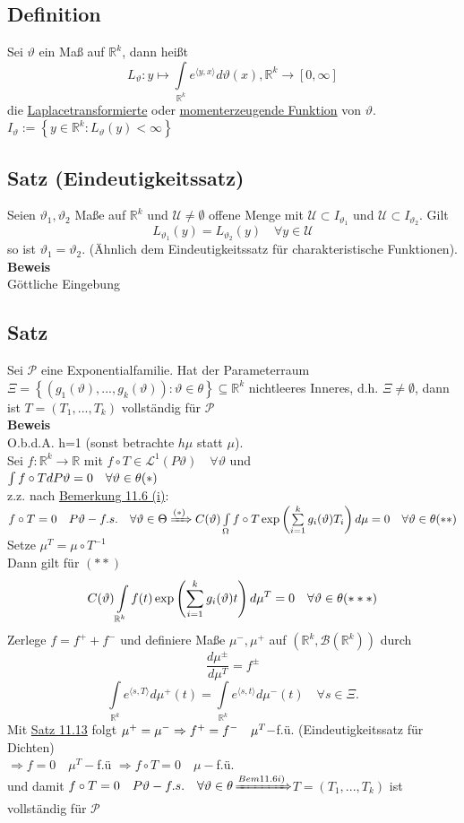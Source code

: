 \documentclass[german,10pt,oneside, fleqn, a4paper]{article}
\newcommand {\R}	{\mathbb{R}}
\newcommand{\Ra}	{\Rightarrow}
\newcommand{\ra}{\rightarrow}
\newcommand{\sm}[2][\infty]{\sum\limits_{#2}^{#1}}
\newcommand{\brc}[1]{\left(#1\right)}
\newcommand{\brac}[1]{\left\lbrace #1\right\rbrace}
\newcommand{\mc}[1]{\mathcal{#1}}
\newcommand{\lp}[1]{\mc{L}^{#1}}
\newcommand{\beweis}{\textbf{Beweis}\\}
\newcommand{\1}[1]{1_{#1}}
\newcommand{\2}[1]{\1{\brac{#1}}}
\newcommand{\rbor}[1][d]{\brc{\R^{#1},\mc{B}\brc{\R^{#1}}}}
\newcommand{\p}{\mc{P}}
\newcommand{\qf}{\quad\forall}
\begin{document}
\subsection{Definition}
\label{11.12}
Sei $\vartheta$ ein Maß auf $\R^k$, dann heißt\[
L_\vartheta:y\mapsto\int\limits_{\R^k}e^{\langle y,x\rangle} d\vartheta(x), \R^k\ra [0,\infty]\]
die \underline{Laplacetransformierte} oder \underline{momenterzeugende Funktion} von $\vartheta$. $I_\vartheta:=\brac{y\in\R^k:L_\vartheta(y)<\infty}$

\subsection{Satz (Eindeutigkeitssatz)}
\label{11.13}
Seien $\vartheta_1,\vartheta_2$ Maße auf $\R^k$ und $\mc{U}\neq\emptyset$ offene Menge mit $\mc{U}\subset I_{\vartheta_1}$ und $\mc{U}\subset I_{\vartheta_2}.$ Gilt \[
L_{\vartheta_1}(y)=L_{\vartheta_2}(y)\qf y\in\mc{U}\]
so ist $\vartheta_1=\vartheta_2$. (Ähnlich dem Eindeutigkeitssatz für charakteristische Funktionen).\\
\beweis
Göttliche Eingebung

\subsection{Satz}
\label{11.14}
Sei $\p$ eine Exponentialfamilie. Hat der Parameterraum \\
$\Xi=\brac{(g_1(\vartheta),...,g_k(\vartheta)):\vartheta\in\theta}\subseteq\R^k$ nichtleeres Inneres, d.h. $\Xi\neq\emptyset$, dann ist $T=(T_1,...,T_k)$ vollständig für $\p$\\
\beweis
O.b.d.A. h=1 (sonst betrachte $h\mu$ statt $\mu$).\\
Sei $f:\R^k\ra\R$ mit $f\circ T \in\lp{1}(P\vartheta)\qf\vartheta$ und \\
$\int f\circ TdP\vartheta=0\qf\vartheta\in\theta\hfill(*)$\\
z.z. nach \hyperref[11.6]{Bemerkung 11.6 (i)}: $f\circ T=0\quad P\vartheta-f.s.\qf\vartheta\in\Theta\\
\xRightarrow{(*)}C(\vartheta)\int\limits_\Omega f\circ T\exp\brc{\sm[k]{i=1}g_i(\vartheta)T_i}d\mu=0\qf\vartheta\in\theta\hfill(**)$\\
Setze $\mu^T=\mu\circ T^{-1}$\\
Dann gilt für $(**)$\[
C(\vartheta)\int\limits_{\R^k}f(t)\exp\brc{\sm[k]{i=1}g_i(\vartheta)t}d\mu^T=0\qf\vartheta\in\theta\hfill(***)
\]
Zerlege $f=f^++f^-$ und definiere Maße $\mu^-,\mu^+$ auf $\rbor[k]$ durch\[
\dfrac{d\mu^{\pm}}{d\mu^T}=f^{\pm}\]\[
\int\limits_{\R^k}e^{\langle s,T\rangle} d\mu^+(t)=\int\limits_{\R^k}e^{\langle s,t\rangle}d\mu^-(t)\qf s\in\Xi.
\]
Mit \hyperref[11.13]{Satz 11.13} folgt $\mu^+=\mu^-\\
\Ra f^+=f^-\quad\mu^T-$f.ü. (Eindeutigkeitssatz für Dichten)\\
$\Ra f=0\quad\mu^T-$f.ü $\Ra f\circ T=0\quad\mu-$f.ü.\\
und damit $f\circ T=0\quad P\vartheta-f.s.\qf\vartheta\in\theta\\
$\hyperref[11.6]{$\xRightarrow{Bem 11.6 i)}$}$ T=(T_1,...,T_k)$ ist vollständig für $\p$
\end{document}
